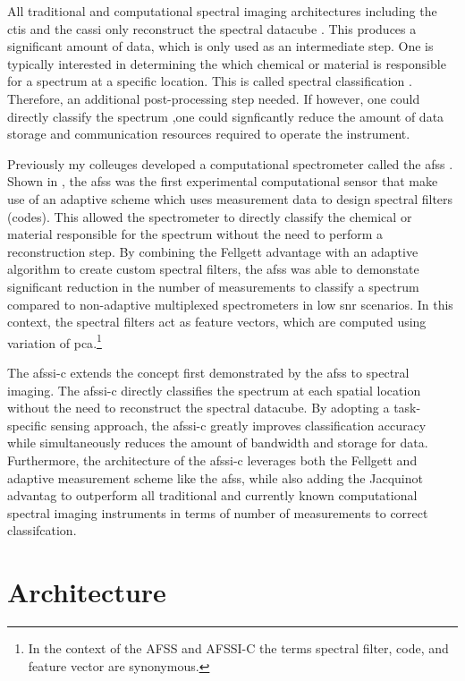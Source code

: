 All traditional and computational spectral imaging architectures including the \gls{ctis} and the \gls{cassi} only reconstruct the spectral datacube \cite{hagen2013review}. This produces a significant amount of data, which is only used as an intermediate step. One is typically interested in determining the which chemical or material is responsible for a spectrum at a specific location. This is called spectral classification \cite{chang2003hyperspectral, dupont2011spatial, liu2014discriminative}. Therefore, an additional post-processing step needed. If however, one could directly classify the spectrum ,one could signficantly reduce the amount of data storage and communication resources required to operate the instrument. 

Previously my colleuges developed a computational spectrometer called the \acrfull{afss} \cite{dinakarababu2011adaptive}. Shown in , the \gls{afss} was the first experimental computational sensor that make use of an adaptive scheme which uses measurement data to design spectral filters (codes). This allowed the spectrometer to directly classify the chemical or material responsible for the spectrum without the need to perform a reconstruction step. By combining the \gls{Fellgett advantage} with an adaptive algorithm to create custom spectral filters, the \gls{afss} was able to demonstate significant reduction in the number of measurements to classify a spectrum compared to non-adaptive multiplexed spectrometers in low \gls{snr} scenarios. In this context, the spectral filters act as feature vectors, which are computed using variation of \gls{pca}.\footnote{In the context of the AFSS and AFSSI-C the terms spectral filter, code, and feature vector are synonymous.}

The \acrfull{afssi-c} extends the concept first demonstrated by the \gls{afss} to spectral imaging. The \gls{afssi-c} directly classifies the spectrum at each spatial location without the need to reconstruct the spectral datacube. By adopting a task-specific sensing approach, the \gls{afssi-c} greatly improves classification accuracy while simultaneously reduces the amount of bandwidth and storage for data. Furthermore, the architecture of the \gls{afssi-c} leverages both the Fellgett and adaptive measurement scheme like the \gls{afss}, while also adding the Jacquinot advantag to outperform all traditional and currently known computational spectral imaging instruments in terms of number of measurements to correct classifcation.

\section{Architecture}

